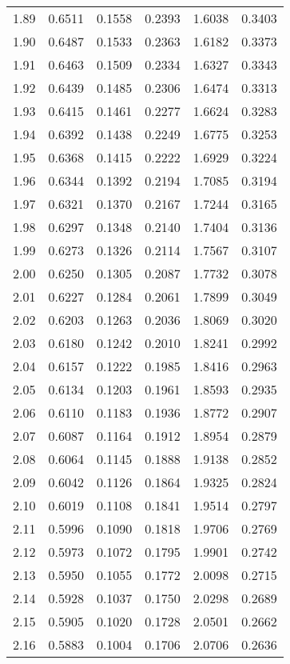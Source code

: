 \documentclass{article}
\begin{document}
\begin{longtable}{cccccc}
1.89 & 0.6511 & 0.1558 & 0.2393 & 1.6038 & 0.3403 \\
1.90 & 0.6487 & 0.1533 & 0.2363 & 1.6182 & 0.3373 \\
1.91 & 0.6463 & 0.1509 & 0.2334 & 1.6327 & 0.3343 \\
1.92 & 0.6439 & 0.1485 & 0.2306 & 1.6474 & 0.3313 \\
1.93 & 0.6415 & 0.1461 & 0.2277 & 1.6624 & 0.3283 \\
1.94 & 0.6392 & 0.1438 & 0.2249 & 1.6775 & 0.3253 \\
1.95 & 0.6368 & 0.1415 & 0.2222 & 1.6929 & 0.3224 \\
1.96 & 0.6344 & 0.1392 & 0.2194 & 1.7085 & 0.3194 \\
1.97 & 0.6321 & 0.1370 & 0.2167 & 1.7244 & 0.3165 \\
1.98 & 0.6297 & 0.1348 & 0.2140 & 1.7404 & 0.3136 \\
1.99 & 0.6273 & 0.1326 & 0.2114 & 1.7567 & 0.3107 \\
2.00 & 0.6250 & 0.1305 & 0.2087 & 1.7732 & 0.3078 \\
2.01 & 0.6227 & 0.1284 & 0.2061 & 1.7899 & 0.3049 \\
2.02 & 0.6203 & 0.1263 & 0.2036 & 1.8069 & 0.3020 \\
2.03 & 0.6180 & 0.1242 & 0.2010 & 1.8241 & 0.2992 \\
2.04 & 0.6157 & 0.1222 & 0.1985 & 1.8416 & 0.2963 \\
2.05 & 0.6134 & 0.1203 & 0.1961 & 1.8593 & 0.2935 \\
2.06 & 0.6110 & 0.1183 & 0.1936 & 1.8772 & 0.2907 \\
2.07 & 0.6087 & 0.1164 & 0.1912 & 1.8954 & 0.2879 \\
2.08 & 0.6064 & 0.1145 & 0.1888 & 1.9138 & 0.2852 \\
2.09 & 0.6042 & 0.1126 & 0.1864 & 1.9325 & 0.2824 \\
2.10 & 0.6019 & 0.1108 & 0.1841 & 1.9514 & 0.2797 \\
2.11 & 0.5996 & 0.1090 & 0.1818 & 1.9706 & 0.2769 \\
2.12 & 0.5973 & 0.1072 & 0.1795 & 1.9901 & 0.2742 \\
2.13 & 0.5950 & 0.1055 & 0.1772 & 2.0098 & 0.2715 \\
2.14 & 0.5928 & 0.1037 & 0.1750 & 2.0298 & 0.2689 \\
2.15 & 0.5905 & 0.1020 & 0.1728 & 2.0501 & 0.2662 \\
2.16 & 0.5883 & 0.1004 & 0.1706 & 2.0706 & 0.2636 \\

\end{longtable}
\end{document}
